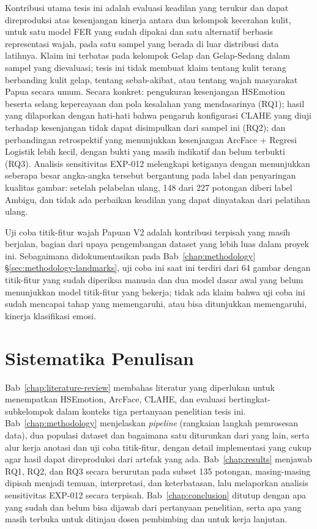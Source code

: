 Kontribusi utama tesis ini adalah evaluasi keadilan yang terukur dan dapat direproduksi atas kesenjangan kinerja antara dua kelompok kecerahan kulit, untuk satu model FER yang sudah dipakai dan satu alternatif berbasis representasi wajah, pada satu sampel yang berada di luar distribusi data latihnya. Klaim ini terbatas pada kelompok Gelap dan Gelap-Sedang dalam sampel yang dievaluasi; tesis ini tidak membuat klaim tentang kulit terang berbanding kulit gelap, tentang sebab-akibat, atau tentang wajah masyarakat Papua secara umum. Secara konkret: pengukuran kesenjangan HSEmotion beserta selang kepercayaan dan pola kesalahan yang mendasarinya (RQ1); hasil yang dilaporkan dengan hati-hati bahwa pengaruh konfigurasi CLAHE yang diuji terhadap kesenjangan tidak dapat disimpulkan dari sampel ini (RQ2); dan perbandingan retrospektif yang menunjukkan kesenjangan ArcFace + Regresi Logistik lebih kecil, dengan bukti yang masih indikatif dan belum terbukti (RQ3). Analisis sensitivitas EXP-012 melengkapi ketiganya dengan menunjukkan seberapa besar angka-angka tersebut bergantung pada label dan penyaringan kualitas gambar: setelah pelabelan ulang, 148 dari 227 potongan diberi label Ambigu, dan tidak ada perbaikan keadilan yang dapat dinyatakan dari pelatihan ulang.

Uji coba titik-fitur wajah Papuan V2 adalah kontribusi terpisah yang masih berjalan, bagian dari upaya pengembangan dataset yang lebih luas dalam proyek ini. Sebagaimana didokumentasikan pada Bab~\ref{chap:methodology} \S\ref{sec:methodology-landmarks}, uji coba ini saat ini terdiri dari 64 gambar dengan titik-fitur yang sudah diperiksa manusia dan dua model dasar awal yang belum menunjukkan model titik-fitur yang bekerja; tidak ada klaim bahwa uji coba ini sudah mencapai tahap yang memengaruhi, atau bisa ditunjukkan memengaruhi, kinerja klasifikasi emosi.

\section{Sistematika Penulisan}
\label{sec:organization}

Bab~\ref{chap:literature-review} membahas literatur yang diperlukan untuk menempatkan HSEmotion, ArcFace, CLAHE, dan evaluasi bertingkat-subkelompok dalam konteks tiga pertanyaan penelitian tesis ini. Bab~\ref{chap:methodology} menjelaskan \textit{pipeline} (rangkaian langkah pemrosesan data), dua populasi dataset dan bagaimana satu diturunkan dari yang lain, serta alur kerja anotasi dan uji coba titik-fitur, dengan detail implementasi yang cukup agar hasil dapat direproduksi dari artefak yang ada. Bab~\ref{chap:results} menjawab RQ1, RQ2, dan RQ3 secara berurutan pada subset 135 potongan, masing-masing dipisah menjadi temuan, interpretasi, dan keterbatasan, lalu melaporkan analisis sensitivitas EXP-012 secara terpisah. Bab~\ref{chap:conclusion} ditutup dengan apa yang sudah dan belum bisa dijawab dari pertanyaan penelitian, serta apa yang masih terbuka untuk ditinjau dosen pembimbing dan untuk kerja lanjutan.
